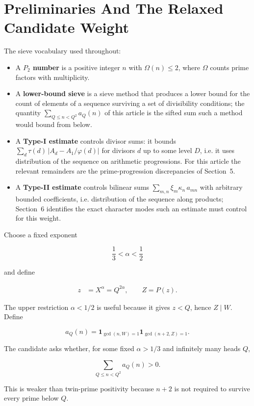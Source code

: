 \section{Preliminaries And The Relaxed Candidate Weight}

The sieve vocabulary used throughout:

\begin{itemize}
\item A \textbf{$P_2$ number} is a positive integer $n$ with
  $\Omega(n)\le2$, where $\Omega$ counts prime factors with multiplicity.
\item A \textbf{lower-bound sieve} is a sieve method that produces a lower bound for
  the count of elements of a sequence surviving a set of divisibility
  conditions; the quantity $\sum_{Q\le n\lt Q^2}a_Q(n)$ of this article is
  the sifted sum such a method would bound from below.
\item A \textbf{Type-I estimate} controls divisor sums: it bounds
  $\sum_d \tau(d)\,\bigl|A_d - A_1/\varphi(d)\bigr|$ for divisors $d$ up to
  some level $D$, i.e. it uses distribution of the sequence on arithmetic
  progressions. For this article the relevant remainders are the
  prime-progression discrepancies of Section~5.
\item A \textbf{Type-II estimate} controls bilinear sums
  $\sum_{m,n}\xi_m\kappa_n\,a_{mn}$ with arbitrary bounded coefficients,
  i.e. distribution of the sequence along products; Section~6 identifies the exact
  character modes such an estimate must control for this weight.
\end{itemize}

Choose a fixed exponent

\begin{equation*}
\frac13\lt\alpha\lt\frac12
\end{equation*}

and define

\begin{equation*}
\begin{aligned}
z&=X^\alpha=Q^{2\alpha},
\qquad
Z=P(z).
\end{aligned}
\end{equation*}

The upper restriction $\alpha\lt 1/2$ is useful because it gives $z\lt Q$, hence
$Z\mid W$. Define

\begin{equation*}
a_Q(n)
=
\mathbf1_{\gcd(n,W)=1}
\mathbf1_{\gcd(n+2,Z)=1}.
\end{equation*}

The candidate asks whether, for some fixed $\alpha>1/3$ and infinitely many
heads $Q$,

\begin{equation*}
\sum_{Q\le n\lt Q^2}a_Q(n)>0.
\end{equation*}

This is weaker than twin-prime positivity because $n+2$ is not required to
survive every prime below $Q$.
